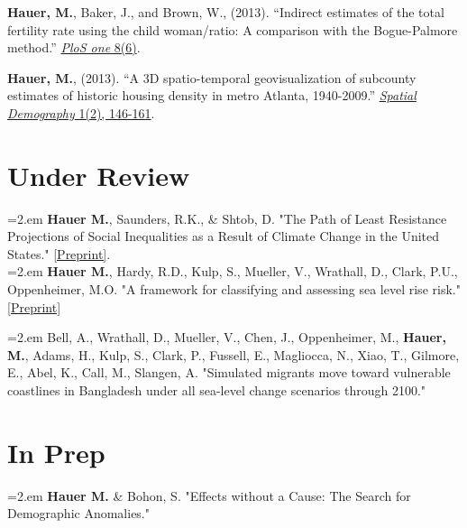 \begin{etaremune}
\item \textbf{Hauer, M.}, Baker, J., and Brown, W., (2013). ``Indirect estimates of the total fertility rate using the child                        woman/ratio: A comparison with the Bogue-Palmore method.'' \href{http://journals.plos.org/plosone/article?id=10.1371/journal.pone.0067226}{\textit{PloS one} 8(6)}.\\

\item \textbf{Hauer, M.}, (2013). ``A 3D spatio-temporal geovisualization of subcounty estimates of historic housing density in metro Atlanta, 1940-2009.'' \href{http://link.springer.com/article/10.1007/BF03354895}{\textit{Spatial Demography} 1(2), 146-161}.\\

 \end{etaremune}


\section{Under Review}

    \hangindent=2.em \textbf{Hauer M.}, Saunders, R.K., \& Shtob, D. "The Path of Least Resistance Projections of Social Inequalities as a Result of Climate Change in the United States." \href{https://osf.io/preprints/socarxiv/7jtrn/}{[Preprint]}. \\

\hangindent=2.em \textbf{Hauer M.}, Hardy, R.D., Kulp, S., Mueller, V., Wrathall, D., Clark, P.U., Oppenheimer, M.O. "A framework for classifying and assessing sea level rise risk." \href{https://osf.io/preprints/socarxiv/tf6rj/}{[Preprint]}

 \hangindent=2.em Bell, A., Wrathall, D., Mueller, V., Chen, J., Oppenheimer, M., \textbf{Hauer, M.}, Adams, H., Kulp, S., Clark, P., Fussell, E., Magliocca, N., Xiao, T., Gilmore, E., Abel, K., Call, M., Slangen, A. "Simulated migrants move toward vulnerable coastlines in Bangladesh under all sea-level change scenarios through 2100."

%
\section{In Prep}

       \hangindent=2.em \textbf{Hauer M.} \& Bohon, S. "Effects without a Cause: The Search for Demographic Anomalies."\\


